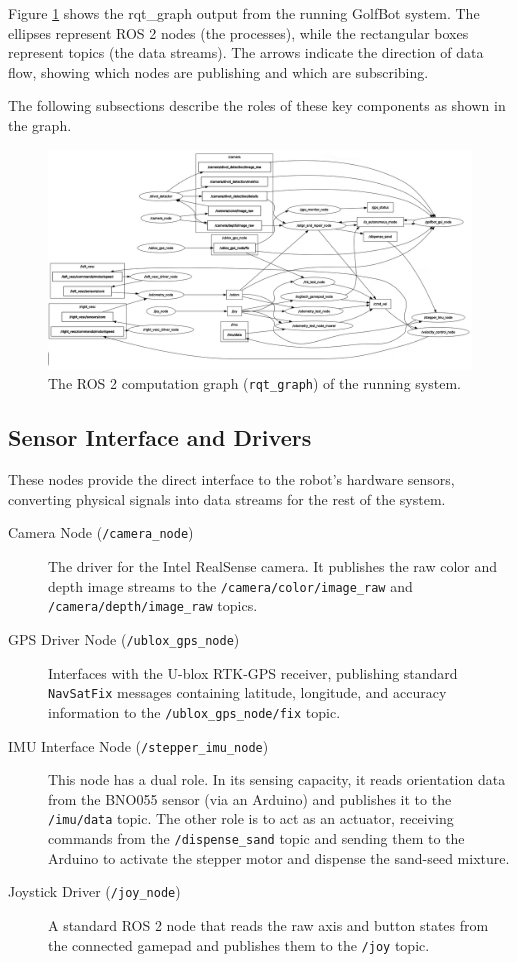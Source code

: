 Figure \ref{fig:ros2_computation_graph} shows the \gls{rqt_graph} output from the running GolfBot system. The ellipses represent ROS 2 nodes (the processes), while the rectangular boxes represent topics (the data streams). The arrows indicate the direction of data flow, showing which nodes are publishing and which are subscribing. 

The following subsections describe the roles of these key components as shown in the graph.

\begin{figure}[h!]
    \centering
    \includegraphics[width=\linewidth]{figures/ros2_nodes.png}
    \caption{The ROS 2 computation graph (\texttt{rqt\_graph}) of the running system.}
    \label{fig:ros2_computation_graph}
\end{figure}

\subsection{Sensor Interface and Drivers}
These nodes provide the direct interface to the robot's hardware sensors, converting physical signals into data streams for the rest of the system.
\begin{description}
    \item[Camera Node (\texttt{/camera\_node})] The driver for the Intel RealSense camera. It publishes the raw color and depth image streams to the \texttt{/camera/color/image\_raw} and \texttt{/camera/depth/image\_raw} topics.
    \item[GPS Driver Node (\texttt{/ublox\_gps\_node})] Interfaces with the U-blox RTK-GPS receiver, publishing standard \texttt{NavSatFix} messages containing latitude, longitude, and accuracy information to the \texttt{/ublox\_gps\_node/fix} topic.
    \item[IMU Interface Node (\texttt{/stepper\_imu\_node})] This node has a dual role. In its sensing capacity, it reads orientation data from the BNO055 sensor (via an Arduino) and publishes it to the \texttt{/imu/data} topic. The other role is to act as an actuator, receiving commands from the \texttt{/dispense\_sand} topic and sending them to the Arduino to activate the stepper motor and dispense the sand-seed mixture.
    \item[Joystick Driver (\texttt{/joy\_node})] A standard ROS 2 node that reads the raw axis and button states from the connected gamepad and publishes them to the \texttt{/joy} topic.
\end{description}

